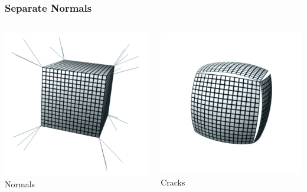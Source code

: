 \begin{frame}\frametitle{Separate Normals}
	\begin{columns}
		\begin{column}{0.4\textwidth}
		\begin{center}
				\includegraphics[width=\textwidth]{img/2_mesh/cracksNormals.png}
				\small{Normals}
			\end{center}	
		\end{column}
		\begin{column}{0.4\textwidth}
		\begin{center}
				\includegraphics[width=\textwidth]{img/2_mesh/cracks.png}
				\small{Cracks}
			\end{center}	
		\end{column}
	\end{columns}
\end{frame}
